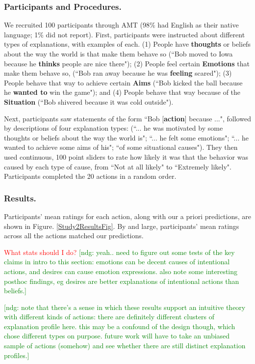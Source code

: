 \documentclass[10pt,letterpaper]{article}
\newcommand{\red}[1]{\textcolor{Red}{#1}}
\newcommand{\ndg}[1]{\textcolor{Green}{[ndg: #1]}}
\begin{document}
\subsubsection{Participants and Procedures.} 
We recruited 100 participants through AMT (98\% had English as their native language; 1\% did not report).
First, participants were instructed about different types of explanations, with examples of each. (1) People have \textbf{thoughts} or beliefs about the way the world is that make them behave so (``Bob moved to Iowa because he \textbf{thinks} people are nice there"); 
(2) People feel certain \textbf{Emotions} that make them behave so, (``Bob ran away because he was \textbf{feeling} scared"); 
(3) People behave that way to achieve certain \textbf{Aims} (``Bob kicked the ball because he \textbf{wanted to} win the game"); and 
(4) People behave that way because of the \textbf{Situation} (``Bob shivered because it was cold outside").

Next, participants saw statements of the form ``Bob [\textbf{action}] because ...", followed by descriptions of four explanation types: (``... he was motivated by some thoughts or beliefs about the way the world is"; ``... he felt some emotions"; ``... he wanted to achieve some aims of his"; ``of some situational causes"). They then used continuous, 100 point sliders to rate how likely it was that the behavior was caused by each type of cause, from ``Not at all likely" to ``Extremely likely". Participants completed the 20 actions in a random order.


\subsubsection{Results.} 
Participants' mean ratings for each action, along with our a priori predictions, are shown in Figure. \ref{Study2ResultsFig}. 
By and large, participants' mean ratings across all the actions matched our predictions.

\red{What stats should I do?}
\ndg{yeah.. need to figure out some tests of the key claims in intro to this section: emotions can be decent causes of intentional actions, and desires can cause emotion expressions. also note some interesting posthoc findings, eg desires are better explanations of intentional actions than beliefs.}

\ndg{note that there's a sense in which these results support an intuitive theory with different kinds of actions: there are definitely different clusters of explanation profile here. this may be a confound of the design though, which chose different types on purpose. future work will have to take an unbiased sample of actions (somehow) and see whether there are still distinct explanation profiles.}
\end{document}
